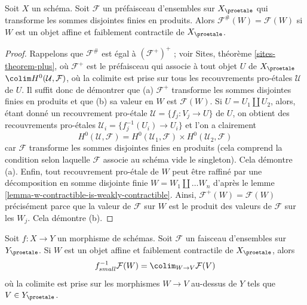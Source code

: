 \begin{lemma}
\label{lemma-presheaf-value-weakly-contractible}
Soit $X$ un schéma. Soit $\mathcal{F}$ un préfaisceau d'ensembles sur $X_\proetale$
qui transforme les sommes disjointes finies en produits. Alors
$\mathcal{F}^\#(W) = \mathcal{F}(W)$ si $W$ est un objet affine et faiblement contractile
de $X_\proetale$.
\end{lemma}

\begin{proof}
Rappelons que $\mathcal{F}^\#$ est égal à $(\mathcal{F}^+)^+$ ; voir
Sites, théorème \ref{sites-theorem-plus}, où $\mathcal{F}^+$
est le préfaisceau qui associe à tout objet $U$ de $X_\proetale$
$\colim H^0(\mathcal{U}, \mathcal{F})$, où la colimite est prise
sur tous les recouvrements pro-\'etales $\mathcal{U}$ de $U$.
Il suffit donc de démontrer que (a) $\mathcal{F}^+$ transforme les sommes
disjointes finies en produits et que (b) sa valeur en $W$ est $\mathcal{F}(W)$.
Si $U = U_1 \amalg U_2$, alors, étant donné un recouvrement pro-\'etale
$\mathcal{U} = \{f_j : V_j \to U\}$ de $U$, on obtient des recouvrements pro-\'etales
$\mathcal{U}_i = \{f_j^{-1}(U_i) \to U_i\}$ et l'on a clairement
$$
H^0(\mathcal{U}, \mathcal{F}) =
H^0(\mathcal{U}_1, \mathcal{F}) \times
H^0(\mathcal{U}_2, \mathcal{F})
$$
car $\mathcal{F}$ transforme les sommes disjointes finies en produits (cela comprend
la condition selon laquelle $\mathcal{F}$ associe au schéma vide le singleton).
Cela démontre (a).
Enfin, tout recouvrement pro-\'etale de $W$ peut être raffiné par une décomposition
en somme disjointe finie $W = W_1 \amalg \ldots W_n$ d'après le
lemme \ref{lemma-w-contractible-is-weakly-contractible}.
Ainsi, $\mathcal{F}^+(W) = \mathcal{F}(W)$ précisément parce que la valeur de
$\mathcal{F}$ sur $W$ est le produit des valeurs de $\mathcal{F}$
sur les $W_j$. Cela démontre (b).
\end{proof}

\begin{lemma}
\label{lemma-small-pullback-weakly-contractible}
Soit $f : X \to Y$ un morphisme de schémas. Soit $\mathcal{F}$ un faisceau
d'ensembles sur $Y_\proetale$. Si $W$ est un objet affine et faiblement contractile
de $X_\proetale$, alors
$$
f_{small}^{-1}\mathcal{F}(W) = \colim_{W \to V} \mathcal{F}(V)
$$
où la colimite est prise sur les morphismes $W \to V$ au-dessus de $Y$
tels que $V \in Y_\proetale$.
\end{lemma}

